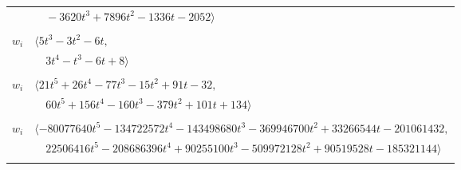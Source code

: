 \documentclass[11pt]{article}
\begin{document}
\begin{longtable}{@{}ll@{}}
 & $\quad -3620t^{3}+7896t^{2}-1336t-2052\rangle$\\
\addlinespace[2pt]
\multicolumn{2}{@{}p{0.97\textwidth}@{}}{$i=58$, $D_i=1$, $\rho_{ij}$: $0{:}2, \allowbreak 6{:}1, \allowbreak 12{:}2, \allowbreak 16{:}1, \allowbreak 18{:}1, \allowbreak 25{:}2, \allowbreak 33{:}1, \allowbreak 39{:}2, \allowbreak 48{:}2$}\\
$w_i$ & $\langle 5t^{3}-3t^{2}-6t,$\\
 & $\quad 3t^{4}-t^{3}-6t+8\rangle$\\
\addlinespace[2pt]
\multicolumn{2}{@{}p{0.97\textwidth}@{}}{$i=59$, $D_i=1$, $\rho_{ij}$: $1{:}1, \allowbreak 2{:}1, \allowbreak 6{:}2, \allowbreak 9{:}1, \allowbreak 13{:}2, \allowbreak 14{:}2, \allowbreak 15{:}1, \allowbreak 17{:}1, \allowbreak 23{:}1, \allowbreak 29{:}1, \allowbreak 33{:}2, \allowbreak 37{:}2, \allowbreak 50{:}2, \allowbreak 63{:}1$}\\
$w_i$ & $\langle 21t^{5}+26t^{4}-77t^{3}-15t^{2}+91t-32,$\\
 & $\quad 60t^{5}+156t^{4}-160t^{3}-379t^{2}+101t+134\rangle$\\
\addlinespace[2pt]
\multicolumn{2}{@{}p{0.97\textwidth}@{}}{$i=60$, $D_i=1$, $\rho_{ij}$: $2{:}2, \allowbreak 3{:}1, \allowbreak 11{:}2, \allowbreak 12{:}1, \allowbreak 13{:}2, \allowbreak 14{:}2, \allowbreak 17{:}2, \allowbreak 20{:}2, \allowbreak 21{:}1, \allowbreak 22{:}2, \allowbreak 23{:}1, \allowbreak 24{:}2, \allowbreak 25{:}1, \allowbreak 26{:}1, \allowbreak 31{:}1, \allowbreak 32{:}2, \allowbreak 36{:}2, \allowbreak 40{:}1, \allowbreak 47{:}1, \allowbreak 57{:}2, \allowbreak 62{:}1, \allowbreak 64{:}1, \allowbreak 68{:}2, \allowbreak 69{:}2, \allowbreak 70{:}2, \allowbreak 71{:}1, \allowbreak 72{:}2, \allowbreak 73{:}2, \allowbreak 76{:}1, \allowbreak 77{:}1, \allowbreak 79{:}2, \allowbreak 81{:}2, \allowbreak 82{:}2, \allowbreak 89{:}2, \allowbreak 97{:}1$}\\
$w_i$ & $\langle -80077640t^{5}-134722572t^{4}-143498680t^{3}-369946700t^{2}+33266544t-201061432,$\\
 & $\quad 22506416t^{5}-208686396t^{4}+90255100t^{3}-509972128t^{2}+90519528t-185321144\rangle$\\
\addlinespace[2pt]
\multicolumn{2}{@{}p{0.97\textwidth}@{}}{$i=61$, $D_i=1$, $\rho_{ij}$: $2{:}1, \allowbreak 3{:}2, \allowbreak 9{:}1, \allowbreak 10{:}1, \allowbreak 12{:}1, \allowbreak 13{:}2, \allowbreak 14{:}1, \allowbreak 15{:}1, \allowbreak 16{:}1, \allowbreak 22{:}2, \allowbreak 23{:}2, \allowbreak 25{:}1, \allowbreak 27{:}2, \allowbreak 29{:}1, \allowbreak 30{:}2, \allowbreak 32{:}1, \allowbreak 37{:}1, \allowbreak 39{:}2, \allowbreak 47{:}1, \allowbreak 63{:}1, \allowbreak 64{:}2, \allowbreak 70{:}2, \allowbreak 71{:}1, \allowbreak 72{:}1, \allowbreak 74{:}1, \allowbreak 75{:}2, \allowbreak 76{:}1, \allowbreak 77{:}2, \allowbreak 78{:}1, \allowbreak 79{:}2, \allowbreak 82{:}1, \allowbreak 89{:}2, \allowbreak 93{:}1, \allowbreak 96{:}2, \allowbreak 97{:}2$}\\

\end{longtable}
\end{document}
